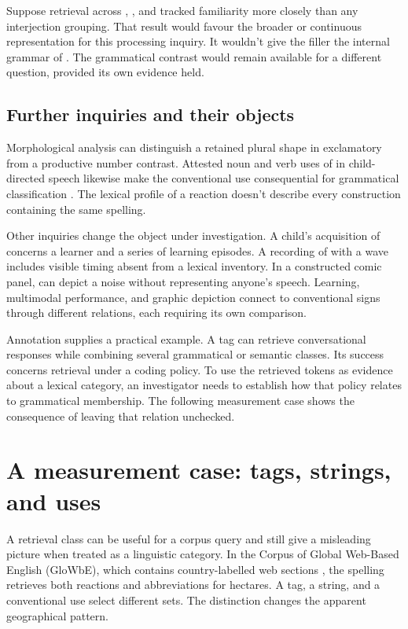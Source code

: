\documentclass[12pt]{article}
\begin{document}
Suppose retrieval across , , and
 tracked familiarity more closely than any
interjection grouping. That result would favour the broader or continuous
representation for this processing inquiry. It wouldn't give the filler
 the internal grammar of . The
grammatical contrast would remain available for a different question,
provided its own evidence held.

\subsection{Further inquiries and their objects}

Morphological analysis can distinguish a retained plural shape in
exclamatory  from a productive number contrast. Attested
noun and verb uses of  in child-directed speech likewise
make the conventional use consequential for grammatical classification
\citep[36]{stange2016}. The lexical profile of a reaction doesn't describe
every construction containing the same spelling.

Other inquiries change the object under investigation. A child's acquisition
of  concerns a learner and a series of learning episodes.
A recording of  with a wave includes visible timing absent
from a lexical inventory. In a constructed comic panel, 
can depict a noise without representing anyone's speech. Learning,
multimodal performance, and graphic depiction connect to conventional signs
through different relations, each requiring its own comparison.

Annotation supplies a practical example. A tag can retrieve conversational
responses while combining several grammatical or semantic classes. Its
success concerns retrieval under a coding policy. To use the retrieved
tokens as evidence about a lexical category, an investigator needs
to establish how that policy relates to grammatical membership. The
following measurement case shows the consequence of leaving that relation
unchecked.

\section{A measurement case: tags, strings, and uses}\label{sec:evidence}

A retrieval class can be useful for a corpus query and still give
a misleading picture when treated as a linguistic category. In the
Corpus of Global Web-Based English (GloWbE), which contains country-labelled
web sections \citep{daviesfuchs2015}, the spelling  retrieves
both reactions and abbreviations for hectares. A tag, a string, and
a conventional use select different sets. The distinction changes the
apparent geographical pattern.
\end{document}
